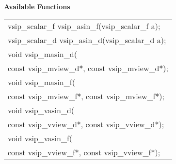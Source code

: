 \\\cvsiplh
\newline \hspace*{.8cm} \vspace*{.1cm} \textbf{Available Functions }
\newline \hspace*{1.1cm} {
\ttfamily
\begin{tabular}[H]{l}
vsip\_scalar\_f vsip\_asin\_f(vsip\_scalar\_f a);\\
vsip\_scalar\_d vsip\_asin\_d(vsip\_scalar\_d a);\\
void vsip\_masin\_d(\\*
\hspace{1cm}const vsip\_mview\_d*, const vsip\_mview\_d*);\\
void vsip\_masin\_f(\\*
\hspace{1cm}const vsip\_mview\_f*, const vsip\_mview\_f*);\\
void vsip\_vasin\_d(\\*
\hspace{1cm}const vsip\_vview\_d*, const vsip\_vview\_d*);\\
void vsip\_vasin\_f(\\*
\hspace{1cm}const vsip\_vview\_f*, const vsip\_vview\_f*);\\
\end{tabular}
}
\\\pyjvsiph
{}
